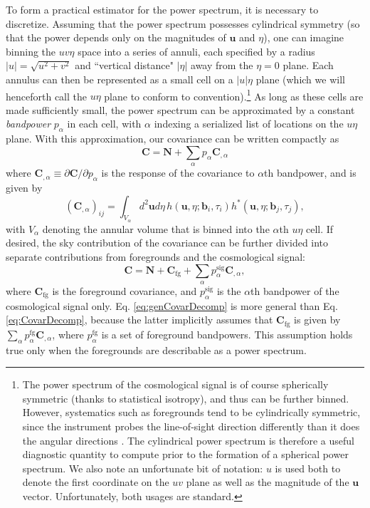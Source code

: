 \documentclass[twocolumn,aps,prd,nofootinbib,showpacs]{revtex4-1}
\begin{document}
To form a practical estimator for the power spectrum, it is necessary to discretize.  Assuming that the power spectrum possesses cylindrical symmetry (so that the power depends only on the magnitudes of $\mathbf{u}$ and $\eta$), one can imagine binning the $uv\eta$ space into a series of annuli, each specified by a radius $|u| =\sqrt{u^2 + v^2}$ and ``vertical distance" $|\eta|$ away from the $\eta=0$ plane.  Each annulus can then be represented as a small cell on a $|u|\eta$ plane (which we will henceforth call the $u\eta$ plane to conform to convention).\footnote{The power spectrum of the cosmological signal is of course spherically symmetric (thanks to statistical isotropy), and thus can be further binned.  However, systematics such as foregrounds tend to be cylindrically symmetric, since the instrument probes the line-of-sight direction differently than it does the angular directions \cite{Morales2004}.  The cylindrical power spectrum is therefore a useful diagnostic quantity to compute prior to the formation of a spherical power spectrum.  We also note an unfortunate bit of notation: $u$ is used both to denote the first coordinate on the $uv$ plane as well as the magnitude of the $\mathbf{u}$ vector.  Unfortunately, both usages are standard.}  As long as these cells are made sufficiently small, the power spectrum can be approximated by a constant \emph{bandpower} $p_\alpha$ in each cell, with $\alpha$ indexing a serialized list of locations on the $u\eta$ plane.  With this approximation, our covariance can be written compactly as
\begin{equation}
\label{eq:CovarDecomp}
\mathbf{C} = \mathbf{N} + \sum_\alpha p_\alpha \mathbf{C}_{,\alpha}
\end{equation}
where $\mathbf{C}_{,\alpha} \equiv \partial \mathbf{C} / \partial p_\alpha$ is the response of the covariance to $\alpha$th bandpower, and is given by
\begin{equation}
\label{eq:CcommaAlpha}
(\mathbf{C}_{,\alpha})_{ij} =  \int_{V_\alpha} d^2 \mathbf{u} d\eta \,  h(\mathbf{u} , \eta; \mathbf{b}_i, \tau_i) h^*(\mathbf{u} , \eta; \mathbf{b}_j, \tau_j),
\end{equation}
with $V_\alpha$ denoting the annular volume that is binned into the $\alpha$th $u\eta$ cell.  If desired, the sky contribution of the covariance can be further divided into separate contributions from foregrounds and the cosmological signal:
\begin{equation}
\label{eq:genCovarDecomp}
\mathbf{C} = \mathbf{N} + \mathbf{C}_\textrm{fg} +  \sum_\alpha p_\alpha^\textrm{sig} \mathbf{C}_{,\alpha},
\end{equation}
where $\mathbf{C}_\textrm{fg}$ is the foreground covariance, and $p_\alpha^\textrm{sig}$ is the $\alpha$th bandpower of the cosmological signal only.   Eq. \eqref{eq:genCovarDecomp} is more general than  Eq. \eqref{eq:CovarDecomp}, because the latter implicitly assumes that $\mathbf{C}_\textrm{fg}$ is given by $\sum_\alpha p_\alpha^\textrm{fg} \mathbf{C}_{,\alpha}$, where $p_\alpha^\textrm{fg}$ is a set of foreground bandpowers.  This assumption holds true only when the foregrounds are describable as a power spectrum.
\end{document}
